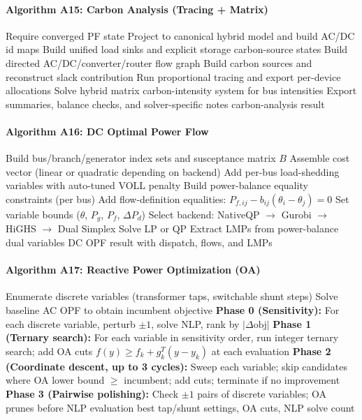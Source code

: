 \paragraph{Algorithm A15: Carbon Analysis (Tracing + Matrix)}
\begin{algorithmic}[1]
  \State Require converged PF state
  \State Project to canonical hybrid model and build AC/DC id maps
  \State Build unified load sinks and explicit storage carbon-source states
  \State Build directed AC/DC/converter/router flow graph
  \State Build carbon sources and reconstruct slack contribution
  \State Run proportional tracing and export per-device allocations
  \State Solve hybrid matrix carbon-intensity system for bus intensities
  \State Export summaries, balance checks, and solver-specific notes
  \State \Return carbon-analysis result
\EndProcedure
\end{algorithmic}

\paragraph{Algorithm A16: DC Optimal Power Flow}
\begin{algorithmic}[1]
  \State Build bus/branch/generator index sets and susceptance matrix $B$
  \State Assemble cost vector (linear or quadratic depending on backend)
  \State Add per-bus load-shedding variables with auto-tuned VOLL penalty
  \State Build power-balance equality constraints (per bus)
  \State Add flow-definition equalities: $P_{f,ij} - b_{ij}(\theta_i - \theta_j) = 0$
  \State Set variable bounds ($\theta$, $P_g$, $P_f$, $\Delta P_d$)
  \State Select backend: NativeQP $\to$ Gurobi $\to$ HiGHS $\to$ Dual Simplex
  \State Solve LP or QP
  \State Extract LMPs from power-balance dual variables
  \State \Return DC OPF result with dispatch, flows, and LMPs
\EndProcedure
\end{algorithmic}

\paragraph{Algorithm A17: Reactive Power Optimization (OA)}
\begin{algorithmic}[1]
  \State Enumerate discrete variables (transformer taps, switchable shunt steps)
  \State Solve baseline AC OPF to obtain incumbent objective
  \State \textbf{Phase 0 (Sensitivity):} For each discrete variable, perturb $\pm 1$, solve NLP, rank by $|\Delta\text{obj}|$
  \State \textbf{Phase 1 (Ternary search):} For each variable in sensitivity order, run integer ternary search; add OA cuts $f(y) \ge f_k + g_k^T(y - y_k)$ at each evaluation
  \State \textbf{Phase 2 (Coordinate descent, up to 3 cycles):} Sweep each variable; skip candidates where OA lower bound $\ge$ incumbent; add cuts; terminate if no improvement
  \State \textbf{Phase 3 (Pairwise polishing):} Check $\pm 1$ pairs of discrete variables; OA prunes before NLP evaluation
  \State \Return best tap/shunt settings, OA cuts, NLP solve count
\EndProcedure
\end{algorithmic}

